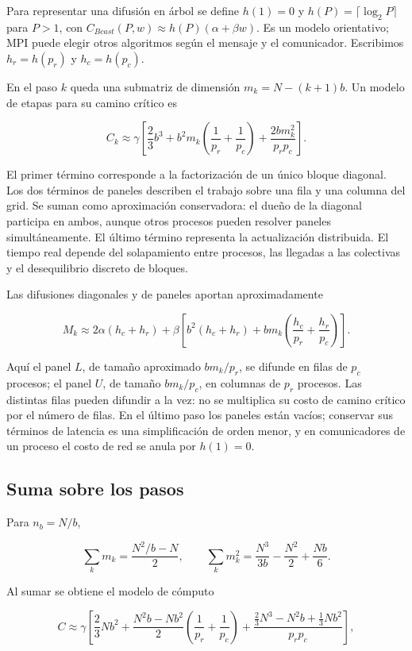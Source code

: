 \documentclass[
  spanish,
  11pt,
  a4paper,
]{article}
\begin{document}
Para representar una difusión en árbol se define \(h(1)=0\) y
\(h(P)=\lceil\log_2P\rceil\) para \(P>1\), con
\(C_{Bcast}(P,w)\approx h(P)(\alpha+\beta w)\). Es un modelo
orientativo; MPI puede elegir otros algoritmos según el mensaje y el
comunicador. Escribimos \(h_r=h(p_r)\) y \(h_c=h(p_c)\).

En el paso \(k\) queda una submatriz de dimensión \(m_k=N-(k+1)b\). Un
modelo de etapas para su camino crítico es

\[C_k\approx\gamma\left[\frac23b^3+b^2m_k\left(\frac1{p_r}+\frac1{p_c}\right)+\frac{2bm_k^2}{p_rp_c}\right].\]

El primer término corresponde a la factorización de un único bloque
diagonal. Los dos términos de paneles describen el trabajo sobre una
fila y una columna del grid. Se suman como aproximación conservadora: el
dueño de la diagonal participa en ambos, aunque otros procesos pueden
resolver paneles simultáneamente. El último término representa la
actualización distribuida. El tiempo real depende del solapamiento entre
procesos, las llegadas a las colectivas y el desequilibrio discreto de
bloques.

Las difusiones diagonales y de paneles aportan aproximadamente

\[M_k\approx 2\alpha(h_c+h_r)+\beta\left[b^2(h_c+h_r)+bm_k\left(\frac{h_c}{p_r}+\frac{h_r}{p_c}\right)\right].\]

Aquí el panel \(L\), de tamaño aproximado \(bm_k/p_r\), se difunde en
filas de \(p_c\) procesos; el panel \(U\), de tamaño \(bm_k/p_c\), en
columnas de \(p_r\) procesos. Las distintas filas pueden difundir a la
vez: no se multiplica su costo de camino crítico por el número de filas.
En el último paso los paneles están vacíos; conservar sus términos de
latencia es una simplificación de orden menor, y en comunicadores de un
proceso el costo de red se anula por \(h(1)=0\).

\subsection{Suma sobre los pasos}\label{suma-sobre-los-pasos}

Para \(n_b=N/b\),

\[\sum_km_k=\frac{N^2/b-N}{2},\qquad
\sum_km_k^2=\frac{N^3}{3b}-\frac{N^2}{2}+\frac{Nb}{6}.\]

Al sumar se obtiene el modelo de cómputo

\[C\approx\gamma\left[\frac23Nb^2+\frac{N^2b-Nb^2}{2}\left(\frac1{p_r}+\frac1{p_c}\right)+\frac{\frac23N^3-N^2b+\frac13Nb^2}{p_rp_c}\right],\]
\end{document}
